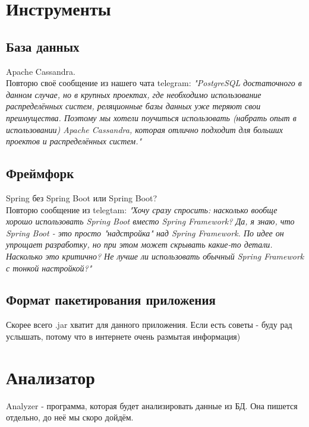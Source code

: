 \documentclass[12pt]{article}
\begin{document}
\section*{Инструменты}
\subsection*{База данных}
Apache Cassandra.\\
Повторю своё сообщение из нашего чата telegram: \textit{"PostgreSQL достаточного в данном случае, но в крупных проектах, 
где необходимо использование распределённых систем, реляционные базы данных уже теряют свои преимущества. 
Поэтому мы хотели поучиться  использовать (набрать опыт в использовании) Apache Cassandra, которая отлично подходит 
для больших проектов и распределённых систем."}

\subsection*{Фреймфорк}
Spring без Spring Boot или Spring Boot? \\
Повторю сообщение из telegtam: \textit{"Хочу сразу спросить: насколько вообще хорошо использовать Spring Boot вместо Spring Framework? 
Да, я знаю, что Spring Boot - это просто "надстройка" над Spring Framework.
По идее он упрощает разработку, но при этом может скрывать какие-то детали. Насколько это критично? 
Не лучше ли использовать обычный Spring Framework с тонкой настройкой?"}

\subsection*{Формат пакетирования приложения}
Скорее всего .jar хватит для данного приложения. Если есть советы - буду рад услышать, потому что в интернете очень размытая информация)

\section*{Анализатор}
Analyzer - программа, которая будет анализировать данные из БД. Она пишется отдельно, до неё мы скоро дойдём.
\end{document}
